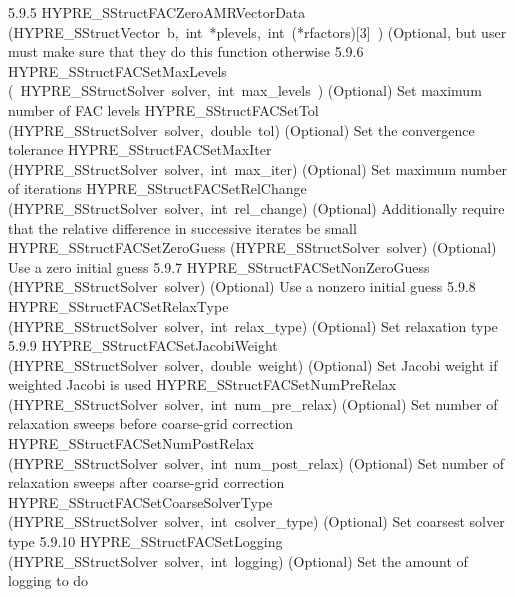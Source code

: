 \documentclass{article}
\begin{document}
\begin{cxxentry}
\begin{cxxentry}
\begin{cxxnames}
        {5.9.5}
        {HYPRE\_SStructFACZeroAMRVectorData}
        {(HYPRE\_SStructVector\ b,\ int\ *plevels,\ int\ (*rfactors)[3]\ )}
        {
(Optional, but user must make sure that they do this function otherwise}
        {5.9.6}
        {HYPRE\_SStructFACSetMaxLevels}
        {(\ HYPRE\_SStructSolver\ solver,\ int\ max\_levels\ )}
        {
(Optional) Set maximum number of FAC levels}
        {}
\label{cxx.5.9.16}
        {HYPRE\_SStructFACSetTol}
        {(HYPRE\_SStructSolver\ solver,\ double\ tol)}
        {
(Optional) Set the convergence tolerance}
        {}
\label{cxx.5.9.17}
        {HYPRE\_SStructFACSetMaxIter}
        {(HYPRE\_SStructSolver\ solver,\ int\ max\_iter)}
        {
(Optional) Set maximum number of iterations}
        {}
\label{cxx.5.9.18}
        {HYPRE\_SStructFACSetRelChange}
        {(HYPRE\_SStructSolver\ solver,\ int\ rel\_change)}
        {
(Optional) Additionally require that the relative difference in
successive iterates be small}
        {}
\label{cxx.5.9.19}
        {HYPRE\_SStructFACSetZeroGuess}
        {(HYPRE\_SStructSolver\ solver)}
        {
(Optional) Use a zero initial guess}
        {5.9.7}
        {HYPRE\_SStructFACSetNonZeroGuess}
        {(HYPRE\_SStructSolver\ solver)}
        {
(Optional) Use a nonzero initial guess}
        {5.9.8}
        {HYPRE\_SStructFACSetRelaxType}
        {(HYPRE\_SStructSolver\ solver,\ int\ relax\_type)}
        {
(Optional) Set relaxation type}
        {5.9.9}
        {HYPRE\_SStructFACSetJacobiWeight}
        {(HYPRE\_SStructSolver\ solver,\ double\ weight)}
        {
(Optional) Set Jacobi weight if weighted Jacobi is used}
        {}
\label{cxx.5.9.20}
        {HYPRE\_SStructFACSetNumPreRelax}
        {(HYPRE\_SStructSolver\ solver,\ int\ num\_pre\_relax)}
        {
(Optional) Set number of relaxation sweeps before coarse-grid correction}
        {}
\label{cxx.5.9.21}
        {HYPRE\_SStructFACSetNumPostRelax}
        {(HYPRE\_SStructSolver\ solver,\ int\ num\_post\_relax)}
        {
(Optional) Set number of relaxation sweeps after coarse-grid correction}
        {}
\label{cxx.5.9.22}
        {HYPRE\_SStructFACSetCoarseSolverType}
        {(HYPRE\_SStructSolver\ solver,\ int\ csolver\_type)}
        {
(Optional) Set coarsest solver type}
        {5.9.10}
        {HYPRE\_SStructFACSetLogging}
        {(HYPRE\_SStructSolver\ solver,\ int\ logging)}
        {
(Optional) Set the amount of logging to do}

\end{cxxnames}
\end{cxxentry}
\end{cxxentry}
\end{document}

